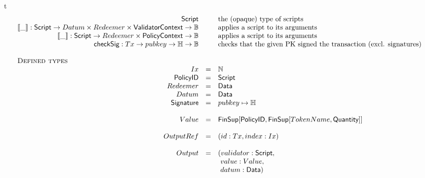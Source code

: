 \begin{ruledfigure}{t}
\begin{displaymath}
\begin{array}{rll}
      \Script && \mbox{the (opaque) type of scripts}\\
      \applyScript{\_}: \Script \rightarrow \Datum \times \Redeemer \times \vlctx \rightarrow \B && \mbox{applies a script to its arguments}\\
      \applyMPScript{\_}: \Script \rightarrow \Redeemer \times \mpsctx \rightarrow \B && \mbox{applies a script to its arguments}\\
      \checkSig : \eutxotx \to \pubkey \to \H \to \B && \mbox{checks that the given PK signed the transaction (excl. signatures)}\\
\\
    \multicolumn{3}{l}{\textsc{Defined types}}\\
    \Ix  &=& \N\\
    \Policy  &=& \Script\\ %
    \Redeemer  &=& \Data\\
    \Datum  &=& \Data\\
    \Signature &=& \pubkey \mapsto \H\\
    \\
    \Value   &=& \FinSup{\Policy}{\FinSup{\TokenName}{\Quantity}}\\
    \\
    \OutputRef &= &(\txrefid: \Tx, \idx: \Ix)\\ %
    \\
    \Output &=&( \validator: \Script,\\
                & &\ \val : \Value, \\
                & &\ \datum: \Data )\\
    \\

\end{array}
\end{displaymath}
\end{ruledfigure}
